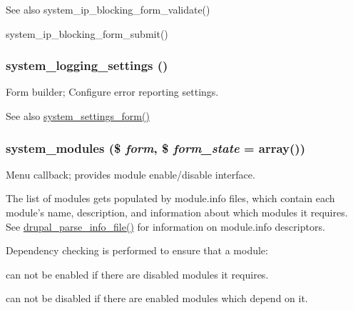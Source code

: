 \begin{DoxySeeAlso}{See also}
system\_\-ip\_\-blocking\_\-form\_\-validate() 

system\_\-ip\_\-blocking\_\-form\_\-submit() 
\end{DoxySeeAlso}
\hypertarget{group__forms_ga3404b7ca761c74436c88ce61aa664c4d}{
\subsubsection[{system\_\-logging\_\-settings}]{\setlength{\rightskip}{0pt plus 5cm}system\_\-logging\_\-settings ()}}
\label{group__forms_ga3404b7ca761c74436c88ce61aa664c4d}
Form builder; Configure error reporting settings.

\begin{DoxySeeAlso}{See also}
\hyperlink{group__forms_ga6fb270d34465d846cd4659a85d3e40c8}{system\_\-settings\_\-form()} 
\end{DoxySeeAlso}
\hypertarget{group__forms_gaf4691243ea56e10a971d3d04a94c47b1}{
\subsubsection[{system\_\-modules}]{\setlength{\rightskip}{0pt plus 5cm}system\_\-modules (\$ {\em form}, \/  \$ {\em form\_\-state} = {\ttfamily array()})}}
\label{group__forms_gaf4691243ea56e10a971d3d04a94c47b1}
Menu callback; provides module enable/disable interface.

The list of modules gets populated by module.info files, which contain each module's name, description, and information about which modules it requires. See \hyperlink{common_8inc_a277955232059631211fcfde533ea89d6}{drupal\_\-parse\_\-info\_\-file()} for information on module.info descriptors.

Dependency checking is performed to ensure that a module:
\begin{DoxyItemize}
\item can not be enabled if there are disabled modules it requires.
\item can not be disabled if there are enabled modules which depend on it.
\end{DoxyItemize}



